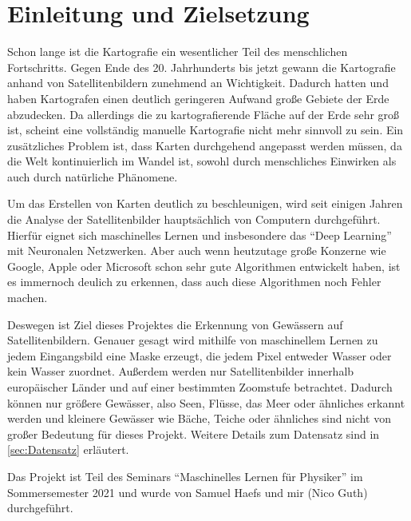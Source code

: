 \section{Einleitung und Zielsetzung}
\label{sec:Einleitung}

Schon lange ist die Kartografie ein wesentlicher Teil des menschlichen Fortschritts.
Gegen Ende des 20. Jahrhunderts bis jetzt gewann die Kartografie anhand von Satellitenbildern zunehmend an Wichtigkeit.
Dadurch hatten und haben Kartografen einen deutlich geringeren Aufwand große Gebiete der Erde abzudecken.
Da allerdings die zu kartografierende Fläche auf der Erde sehr groß ist, scheint eine vollständig manuelle Kartografie nicht mehr sinnvoll zu sein.
Ein zusätzliches Problem ist, dass Karten durchgehend angepasst werden müssen, da die Welt kontinuierlich im Wandel ist, 
sowohl durch menschliches Einwirken als auch durch natürliche Phänomene.

Um das Erstellen von Karten deutlich zu beschleunigen, wird seit einigen Jahren die Analyse der Satellitenbilder hauptsächlich von Computern durchgeführt.
Hierfür eignet sich maschinelles Lernen und insbesondere das \enquote{Deep Learning} mit Neuronalen Netzwerken.
Aber auch wenn heutzutage große Konzerne wie Google, Apple oder Microsoft schon sehr gute Algorithmen entwickelt haben,
ist es immernoch deulich zu erkennen, dass auch diese Algorithmen noch Fehler machen.

Deswegen ist Ziel dieses Projektes die Erkennung von Gewässern auf Satellitenbildern.
Genauer gesagt wird mithilfe von maschinellem Lernen zu jedem Eingangsbild eine Maske erzeugt, die jedem Pixel entweder Wasser oder kein Wasser zuordnet.
Außerdem werden nur Satellitenbilder innerhalb europäischer Länder und auf einer bestimmten Zoomstufe betrachtet.
Dadurch können nur größere Gewässer, also Seen, Flüsse, das Meer oder ähnliches erkannt werden und kleinere Gewässer wie Bäche, Teiche oder ähnliches sind nicht von großer Bedeutung für dieses Projekt.
Weitere Details zum Datensatz sind in \autoref{sec:Datensatz} erläutert.

Das Projekt ist Teil des Seminars \enquote{Maschinelles Lernen für Physiker} im Sommersemester 2021 und wurde von Samuel Haefs und mir (Nico Guth) durchgeführt.
